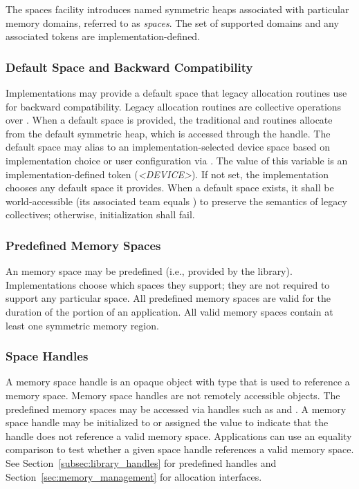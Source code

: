 The \openshmem spaces facility introduces named symmetric heaps associated with
particular memory domains, referred to as \emph{spaces}. The set of supported
domains and any associated tokens are implementation-defined.

\subsubsection*{Default Space and Backward Compatibility}

Implementations may provide a default space that legacy allocation routines use
for backward compatibility. Legacy allocation routines are collective
operations over . When a default space is
provided, the traditional  and 
routines allocate from the
default symmetric heap, which is accessed through the
 handle. The default space may alias to an
implementation-selected device space 
based on implementation choice or user configuration via
. The value of this variable is an implementation-defined
token (\textit{<DEVICE>}). If not set, the implementation chooses any
default space it provides. When a default space exists, it shall be
world-accessible (its associated team equals )
to preserve the semantics of legacy collectives; otherwise, \openshmem
initialization shall fail.

\subsubsection*{Predefined Memory Spaces}

An \openshmem memory space may be predefined (i.e., provided by the
\openshmem library). Implementations choose which spaces they support; they are
not required to support any particular space. All predefined memory spaces are
valid for the duration of the \openshmem portion of an application. All valid
memory spaces contain at least one symmetric memory region.

\subsubsection*{Space Handles}

A memory space handle is an opaque object with type 
that is used to reference a memory space. Memory space handles are not
remotely accessible objects. The predefined memory spaces may be accessed via
handles such as  and
. A memory space handle may be
initialized to or assigned the value  to
indicate that the handle does not reference a valid memory space. Applications
can use an equality comparison to test whether a given space handle references
a valid memory space. See Section~\ref{subsec:library_handles} for predefined
handles and Section~\ref{sec:memory_management} for allocation interfaces.

